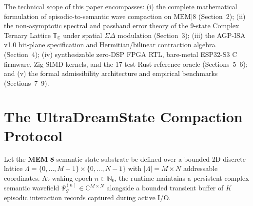 \documentclass[10pt, twocolumn, a4paper]{article}
\begin{document}
The technical scope of this paper encompasses: (i) the complete mathematical formulation of episodic-to-semantic wave compaction on $\text{MEM}|8$ (Section~2); (ii) the non-asymptotic spectral and passband error theory of the 9-state Complex Ternary Lattice $\mathbb{T}_{\mathbb{C}}$ under spatial $\Sigma\Delta$ modulation (Section~3); (iii) the AGP-ISA v1.0 bit-plane specification and Hermitian/bilinear contraction algebra (Section~4); (iv) synthesizable zero-DSP FPGA RTL, bare-metal ESP32-S3 C firmware, Zig SIMD kernels, and the 17-test Rust reference oracle (Sections~5--6); and (v) the formal admissibility architecture and empirical benchmarks (Sections~7--9).

\section{The UltraDreamState Compaction Protocol}

Let the \textbf{MEM|8} semantic-state substrate \cite{guimond2026memnet} be defined over a bounded 2D discrete lattice $\Lambda = \{0, \dots, M-1\} \times \{0, \dots, N-1\}$ with $|\Lambda| = M \times N$ addressable coordinates. At waking epoch $n \in \mathbb{N}_0$, the runtime maintains a persistent complex semantic wavefield $\Psi_S^{(n)} \in \mathbb{C}^{M \times N}$ alongside a bounded transient buffer of $K$ episodic interaction records captured during active I/O.
\end{document}

